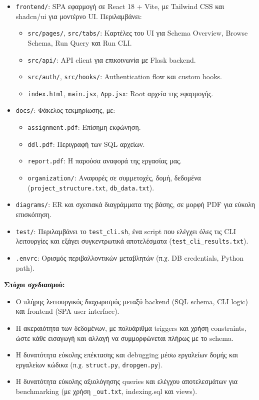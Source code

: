 \documentclass[13pt]{extarticle}
\begin{document}
\begin{itemize}
  \item \texttt{frontend/}: SPA εφαρμογή σε React 18 + Vite, με Tailwind CSS και shadcn/ui για μοντέρνο UI. Περιλαμβάνει:
  \begin{itemize}
    \item \texttt{src/pages/}, \texttt{src/tabs/}: Καρτέλες του UI για Schema Overview, Browse Schema, Run Query και Run CLI.
    \item \texttt{src/api/}: API client για επικοινωνία με Flask backend.
    \item \texttt{src/auth/}, \texttt{src/hooks/}: Authentication flow και custom hooks.
    \item \texttt{index.html}, \texttt{main.jsx}, \texttt{App.jsx}: Root αρχεία της εφαρμογής.
  \end{itemize}

  \item \texttt{docs/}: Φάκελος τεκμηρίωσης, με:
  \begin{itemize}
    \item \texttt{assignment.pdf}: Επίσημη εκφώνηση.
    \item \texttt{ddl.pdf}: Περιγραφή των SQL αρχείων.
    \item \texttt{report.pdf}: Η παρούσα αναφορά της εργασίας μας.
    \item \texttt{organization/}: Αναφορές σε συμμετοχές, δομή, δεδομένα (\texttt{project\_structure.txt}, \texttt{db\_data.txt}).
  \end{itemize}

  \item \texttt{diagrams/}: ER και σχεσιακά διαγράμματα της βάσης, σε μορφή PDF για εύκολη επισκόπηση.

  \item \texttt{test/}: Περιλαμβάνει το \texttt{test\_cli.sh}, ένα script που ελέγχει όλες τις CLI λειτουργίες και εξάγει συγκεντρωτικά αποτελέσματα (\texttt{test\_cli\_results.txt}).

  \item \texttt{.envrc}: Ορισμός περιβαλλοντικών μεταβλητών (π.χ. DB credentials, Python path).
\end{itemize}

\vspace{1em}
\noindent\textbf{Στόχοι σχεδιασμού:}
\begin{itemize}
  \item Ο πλήρης λειτουργικός διαχωρισμός μεταξύ backend (SQL schema, CLI logic) και frontend (SPA user interface).
  \item Η ακεραιότητα των δεδομένων, με πολυάριθμα triggers και χρήση constraints, ώστε κάθε εισαγωγή και αλλαγή να συμμορφώνεται πλήρως με το schema.
  \item Η δυνατότητα εύκολης επέκτασης και debugging μέσω εργαλείων δομής και εργαλείων κώδικα (π.χ. \texttt{struct.py}, \texttt{dropgen.py}).
  \item Η δυνατότητα εύκολης αξιολόγησης queries και ελέγχου αποτελεσμάτων για benchmarking (με χρήση \texttt{\_out.txt}, indexing.sql και views).
\end{itemize}
\end{document}
